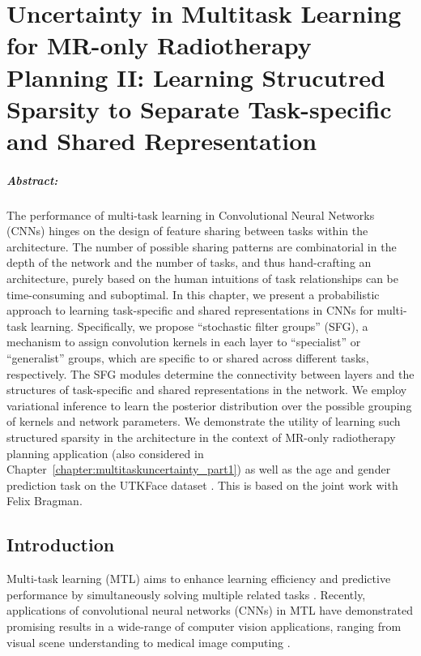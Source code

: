 \chapter{Uncertainty in Multitask Learning for MR-only Radiotherapy Planning II: Learning Strucutred Sparsity to Separate Task-specific and Shared Representation}\label{chapter:multitaskuncertainty_part2}

\paragraph{Abstract:} The performance of multi-task learning in Convolutional Neural Networks (CNNs) hinges on the design of feature sharing between tasks within the architecture. The number of possible sharing patterns are combinatorial in the depth of the network and the number of tasks, and thus hand-crafting an architecture, purely based on the human intuitions of task relationships can be time-consuming and suboptimal. In this chapter, we present a probabilistic approach to learning task-specific and shared representations in CNNs for multi-task learning. Specifically, we propose ``stochastic filter groups'' (SFG), a mechanism to assign convolution kernels in each layer to ``specialist'' or ``generalist'' groups, which are specific to or shared across different tasks, respectively. The SFG modules determine the connectivity between layers and the structures of task-specific and shared representations in the network. We employ variational inference to learn the posterior distribution over the possible grouping of kernels and network parameters. We demonstrate the utility of learning such structured sparsity in the architecture in the context of MR-only radiotherapy planning application (also considered in Chapter~\ref{chapter:multitaskuncertainty_part1}) as well as the age and gender prediction task on the UTKFace dataset \cite{zhifei2017cvpr}. This is based on the joint work \cite{sfg2019} with Felix Bragman. 

\section{Introduction}
Multi-task learning (MTL) aims to enhance learning efficiency and predictive performance by simultaneously solving multiple related tasks \cite{caruana1997multitask}. Recently, applications of convolutional neural networks (CNNs) in MTL have demonstrated promising results in a wide-range of computer vision applications, ranging from visual scene understanding \cite{sermanet2014overfeat,eigen2015predicting,MisraCrossMTL16,kokkinos2017ubernet,ranjan2019hyperface,bilen2016integrated} to medical image computing \cite{moeskops2016deep,chen2016bridging,bragman2018multi,tanno2018autodvt}. 


